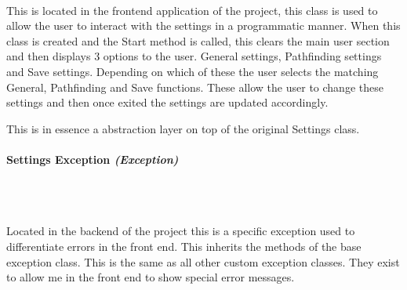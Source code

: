 \begin{FlushLeft}
    \begin{figure}[H]
        \centering
    \end{figure}\\
    This is located in the frontend application of the project, this class is used to allow the user to interact with the settings in a programmatic manner. When this class is created and the Start method is called, this clears the main user section and then displays 3 options to the user. General settings, Pathfinding settings and Save settings. Depending on which of these the user selects the matching General, Pathfinding and Save functions. These allow the user to change these settings and then once exited the settings are updated accordingly. \\ \bk

    This is in essence a abstraction layer on top of the original Settings class. \\
    \bk

\paragraph{Settings Exception \textit{(Exception)}} \mbox{} \\

    \begin{figure}[H]
        \centering
    \end{figure}\\
    Located in the backend of the project this is a specific exception used to differentiate errors in the front end. This inherits the methods of the base exception class. This is the same as all other custom exception classes. They exist to allow me in the front end to show special error messages.
    \bk


\end{FlushLeft}
